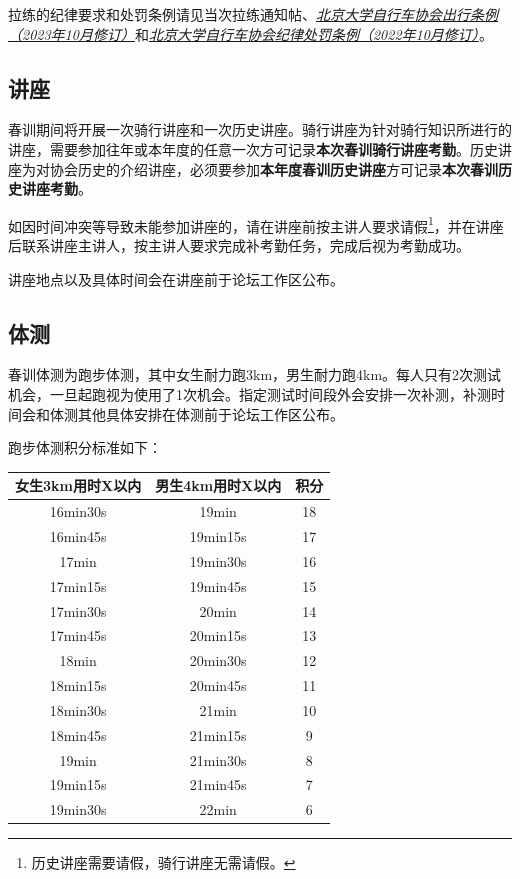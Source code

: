 \documentclass[UTF8]{ctexart}
\begin{document}
拉练的纪律要求和处罚条例请见当次拉练通知帖、\href{https://chexie.net/bbs/content/?bid=1&tid=9618&p=1}{\textit{北京大学自行车协会出行条例（2023年10月修订）}}和\href{https://chexie.net/bbs/content/?bid=1&tid=9260&p=1}{\textit{北京大学自行车协会纪律处罚条例（2022年10月修订）}}。

\subsection{讲座}


春训期间将开展一次骑行讲座和一次历史讲座。骑行讲座为针对骑行知识所进行的讲座，需要参加往年或本年度的任意一次方可记录\textbf{本次春训骑行讲座考勤}。历史讲座为对协会历史的介绍讲座，必须要参加\textbf{本年度春训历史讲座}方可记录\textbf{本次春训历史讲座考勤}。

如因时间冲突等导致未能参加讲座的，请在讲座前按主讲人要求请假\footnote{历史讲座需要请假，骑行讲座无需请假。}，并在讲座后联系讲座主讲人，按主讲人要求完成补考勤任务，完成后视为考勤成功。

讲座地点以及具体时间会在讲座前于论坛工作区公布。

\subsection{体测}

春训体测为跑步体测，其中女生耐力跑3km，男生耐力跑4km。每人只有2次测试机会，一旦起跑视为使用了1次机会。指定测试时间段外会安排一次补测，补测时间会和体测其他具体安排在体测前于论坛工作区公布。

跑步体测积分标准如下：

\begin{table}[h]
    \centering
    \begin{tabular}{|c|c|c|}
    \hline
    女生3km用时X以内 & 男生4km用时X以内 & 积分 \\ \hline
    16min30s   & 19min      & 18 \\ \hline
    16min45s   & 19min15s   & 17 \\ \hline
    17min      & 19min30s   & 16 \\ \hline
    17min15s   & 19min45s   & 15 \\ \hline
    17min30s   & 20min      & 14 \\ \hline
    17min45s   & 20min15s   & 13 \\ \hline
    18min      & 20min30s   & 12 \\ \hline
    18min15s   & 20min45s   & 11 \\ \hline
    18min30s   & 21min      & 10 \\ \hline
    18min45s   & 21min15s   & 9  \\ \hline
    19min      & 21min30s   & 8  \\ \hline
    19min15s   & 21min45s   & 7  \\ \hline
    19min30s   & 22min      & 6  \\ \hline
    \end{tabular}\label{test}
    \end{table}
\end{document}
